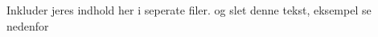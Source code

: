 \documentclass[a4paper, 11pt, oneside]{AuProjectHandin}
\begin{document}

\frontmatter
\tableofcontents
\mainmatter

Inkluder jeres indhold her i seperate filer. og slet denne tekst, eksempel se nedenfor
%	
\backmatter

\end{document}
